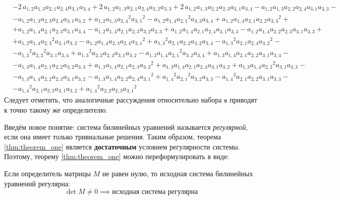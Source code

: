 \begin{equation}
\begin{aligned}
        &- 2\,a_{{1,2}}a_{{1,3}}a_{{2,1}}a_{{2,4}}a_{{3,1}}a_{{3,4}} + 2\,a_{{1,2}}a_{{1,3}}a_{{2,1}}a_{{2,4}}a_{{3,2}}a_{{3,3}} + 2\,a_{{1,2}}a_{{1,3}}a_{{2,2}}a_{{2,3}}a_{{3,1}}a_{{3,4}} - a_{{1,2}}a_{{1,3}}a_{{2,2}}a_{{2,4}}a_{{3,1}}a_{{3,3}} - \\
        &- a_{{1,2}}a_{{1,3}}a_{{2,3}}a_{{2,4}}a_{{3,1}}a_{{3,2}} + a_{{1,2}}a_{{1,3}}{a_{{2,4}}}^{2}{a_{{3,1}}}^{2} - a_{{1,2}}a_{{1,4}}{a_{{2,1}}}^{2}a_{{3,3}}a_{{3,4}} + a_{{1,2}}a_{{1,4}}a_{{2,1}}a_{{2,2}}{a_{{3,3}}}^{2} + \\ 
        &+ a_{{1,2}}a_{{1,4}}a_{{2,1}}a_{{2,3}}a_{{3,1}}a_{{3,4}} - a_{{1,2}}a_{{1,4}}a_{{2,1}}a_{{2,3}}a_{{3,2}}a_{{3,3}} + a_{{1,2}}a_{{1,4}}a_{{2,1}}a_{{2,4}}a_{{3,1}}a_{{3,3}} - a_{{1,2}}a_{{1,4}}a_{{2,2}}a_{{2,3}}a_{{3,1}}a_{{3,3}} + \\ 
        &+ a_{{1,2}}a_{{1,4}}{a_{{2,3}}}^{2}a_{{3,1}}a_{{3,2}} - a_{{1,2}}a_{{1,4}}a_{{2,3}}a_{{2,4}}{a_{{3,1}}}^{2} + {a_{{1,3}}}^{2}a_{{2,1}}a_{{2,2}}a_{{3,2}}a_{{3,4}} - {a_{{1,3}}}^{2}a_{{2,1}}a_{{2,4}}{a_{{3,2}}}^{2} -\\ 
        &- {a_{{1,3}}}^{2}{a_{{2,2}}}^{2}a_{{3,1}}a_{{3,4}} + {a_{{1,3}}}^{2}a_{{2,2}}a_{{2,4}}a_{{3,1}}a_{{3,2}} - a_{{1,3}}a_{{1,4}}{a_{{2,1}}}^{2}a_{{3,2}}a_{{3,4}} + a_{{1,3}}a_{{1,4}}a_{{2,1}}a_{{2,2}}a_{{3,1}}a_{{3,4}} - \\ 
        &- a_{{1,3}}a_{{1,4}}a_{{2,1}}a_{{2,2}}a_{{3,2}}a_{{3,3}} + a_{{1,3}}a_{{1,4}}a_{{2,1}}a_{{2,3}}{a_{{3,2}}}^{2} + a_{{1,3}}a_{{1,4}}a_{{2,1}}a_{{2,4}}a_{{3,1}}a_{{3,2}} + a_{{1,3}}a_{{1,4}}{a_{{2,2}}}^{2}a_{{3,1}}a_{{3,3}} - \\ 
        &- a_{{1,3}}a_{{1,4}}a_{{2,2}}a_{{2,3}}a_{{3,1}}a_{{3,2}} - a_{{1,3}}a_{{1,4}}a_{{2,2}}a_{{2,4}}{a_{{3,1}}}^{2} + {a_{{1,4}}}^{2}{a_{{2,1}}}^{2}a_{{3,2}}a_{{3,3}} - {a_{{1,4}}}^{2}a_{{2,1}}a_{{2,2}}a_{{3,1}}a_{{3,3}} - \\ 
        &- {a_{{1,4}}}^{2}a_{{2,1}}a_{{2,3}}a_{{3,1}}a_{{3,2}} + {a_{{1,4}}}^{2}a_{{2,2}}a_{{2,3}}{a_{{3,1}}}^{2}
\end{aligned}
\end{equation}
Следует отметить, что аналогичные рассуждения относительно набора $\mathbf{s}$ приводят к точно такому же 
определителю. 

Введём новое понятие: система билинейных уравнений называется \textit{регулярной}, если она 
имеет только тривиальные решения. Таким образом, теорема \ref{thm:theorem_one} является 
\textbf{достаточным} условием регулярности системы. Поэтому, теорему \ref{thm:theorem_one} можно 
переформулировать в виде: 
\begin{theorem_alt}
Если определитель матрицы $M$ не равен нулю, то исходная система билинейных уравнений регулярна:
$$
\det M \ne 0 \implies\text{исходная система регулярна} 
$$
\end{theorem_alt}

